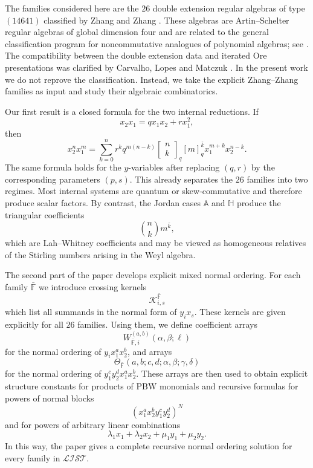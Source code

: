 \documentclass{amsart}
\theoremstyle{definition}
\theoremstyle{remark}
\numberwithin{equation}{section}
\begin{document}
The families considered here are the $26$ double extension regular algebras of type $(14641)$ classified by Zhang and Zhang \cite{ZhangZhang2009}. These algebras are Artin--Schelter regular algebras of global dimension four and are related to the general classification program for noncommutative analogues of polynomial algebras; see \cite{ArtinSchelter1987,Rogalski2023}. The compatibility between the double extension data and iterated Ore presentations was clarified by Carvalho, Lopes and Matczuk \cite{Carvalhoetal2011}. In the present work we do not reprove the classification. Instead, we take the explicit Zhang--Zhang families as input and study their algebraic combinatorics.

Our first result is a closed formula for the two internal reductions. If
\[
x_2x_1=qx_1x_2+rx_1^2,
\]
then
\[
x_2^nx_1^m
=
\sum_{k=0}^{n}
 r^kq^{m(n-k)}
\begin{bmatrix} n\\ k \end{bmatrix}_{q}
[m]_{q}^{\overline{k}}
 x_1^{m+k}x_2^{n-k}.
\]
The same formula holds for the $y$-variables after replacing $(q,r)$ by the corresponding parameters $(p,s)$. This already separates the $26$ families into two regimes. Most internal systems are quantum or skew-commutative and therefore produce scalar factors. By contrast, the Jordan cases $\mathbb{A}$ and $\mathbb{H}$ produce the triangular coefficients
\[
\binom{n}{k}m^{\overline{k}},
\]
which are Lah--Whitney coefficients and may be viewed as homogeneous relatives of the Stirling numbers arising in the Weyl algebra.

The second part of the paper develops explicit mixed normal ordering. For each family $\bar{\mathbb{F}}$ we introduce crossing kernels
\[
\mathscr{K}_{i,s}^{\bar{\mathbb{F}}}
\]
which list all summands in the normal form of $y_ix_s$. These kernels are given explicitly for all $26$ families. Using them, we define coefficient arrays
\[
W_{\bar{\mathbb{F}},i}^{(a,b)}(\alpha,\beta;\ell)
\]
for the normal ordering of $y_ix_1^ax_2^b$, and arrays
\[
\Theta_{\bar{\mathbb{F}}}(a,b;c,d;\alpha,\beta;\gamma,\delta)
\]
for the normal ordering of $y_1^cy_2^dx_1^ax_2^b$. These arrays are then used to obtain explicit structure constants for products of PBW monomials and recursive formulas for powers of normal blocks
\[
(x_1^ax_2^by_1^cy_2^d)^N
\]
and for powers of arbitrary linear combinations
\[
\lambda_1x_1+\lambda_2x_2+\mu_1y_1+\mu_2y_2.
\]
In this way, the paper gives a complete recursive normal ordering solution for every family in $\mathcal{LIST}$.
\end{document}
